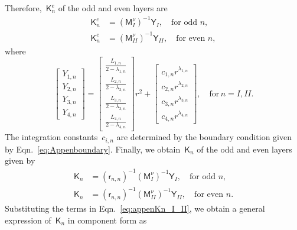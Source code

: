 \documentclass[preprint,10pt,times]{elsarticle}
\numberwithin{equation}{section}
\renewcommand{\u}[1]{\boldsymbol{#1}}
\newcommand{\usf}[1]{\u{\mathsf #1}}
\renewcommand{\>}{$\Rightarrow$}
\begin{document}
Therefore,~$\usf{K}_n^e$ of the odd and even layers are
\begin{subequations}
\begin{align}
\usf{K}_n^e & = \left( \usf{M}_I^{\nu} \right)^{-1}\usf{Y}_I, \quad \text{for odd~$n$}, \\
\usf{K}_n^e & = \left( \usf{M}_{II}^{\nu} \right)^{-1}\usf{Y}_{II}, \quad \text{for even~$n$},
\end{align}
\end{subequations}
where
\begin{equation}
	\begin{bmatrix}
	 Y_{1,n} \\ Y_{2,n} \\ Y_{3,n} \\ Y_{4,n}
	\end{bmatrix}
	=
	\begin{bmatrix}
	 \frac{L_{1,n}}{2-\lambda_{1,n}} \\ \frac{L_{2,n}}{2-\lambda_{2,n}} \\ \frac{L_{3,n}}{2-\lambda_{3,n}} \\ \frac{L_{4,n}}{2-\lambda_{4,n}}
	\end{bmatrix}r^2
	+
	\begin{bmatrix}
	 c_{1,n} r^{\lambda_{1,n}} \\ c_{2,n} r^{\lambda_{2,n}} \\ c_{3,n} r^{\lambda_{3,n}} \\ c_{4,n} r^{\lambda_{4,n}}
	\end{bmatrix}, \quad \text{for} \, n = I, II.
\end{equation}
The integration constants~$c_{i,n}$ are determined by the boundary condition given by Eqn.~\eqref{eq:Appenboundary}.
Finally, we obtain~$\usf{K}_n$ of the odd and even layers given by
\begin{subequations}
\begin{align}
	\usf{K}_n & = (\usf{r}_{n,n})^{-1} (\usf{M}_I^{\nu})^{-1}\usf{Y}_I, \quad \text{for odd~$n$}, \\
	\usf{K}_n & = (\usf{r}_{n,n})^{-1} (\usf{M}_{II}^{\nu})^{-1}\usf{Y}_{II}, \quad \text{for even~$n$}.
\end{align}
\label{eq:appenKn_I_II}
\end{subequations}
Substituting the terms in Eqn.~\eqref{eq:appenKn_I_II}, we obtain a general expression of~$\usf{K}_n$ in component form as
\end{document}
